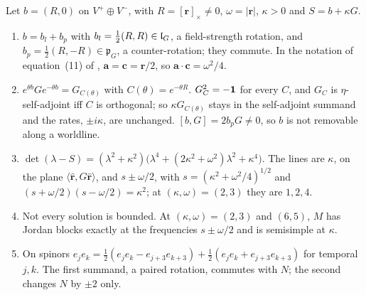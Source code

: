 \begin{proposition}
\label{e6:prop:binding}
Let $b=(R,0)$ on $V^+\oplus V^-$, with $R=[\mathbf r]_\times\neq0$, $\omega=|\mathbf r|$, $\kappa>0$ and $S=b+\kappa G$.
\begin{enumerate}[label=(\roman*),leftmargin=2.2em]
\item $b=b_l+b_p$ with $b_l=\tfrac12(R,R)\in\mathfrak l_G$, a field-strength rotation, and $b_p=\tfrac12(R,-R)\in\mathfrak p_G$, a counter-rotation; they commute. In
the notation of equation~(11) of \cite{RE}, $\mathbf a=\mathbf c=\mathbf r/2$, so $\mathbf a\cdot\mathbf c=\omega^2/4$.
\item $e^{\theta b}Ge^{-\theta b}=G_{C(\theta)}$ with $C(\theta)=e^{-\theta R}$. $G_C^2=-\mathbf 1$ for every $C$, and $G_C$ is $\eta$-self-adjoint iff $C$ is
orthogonal; so $\kappa G_{C(\theta)}$ stays in the self-adjoint summand and the rates, $\pm i\kappa$, are unchanged. $[b,G]=2b_pG\neq0$, so $b$ is not removable along a worldline.
\item $\det(\lambda-S)=(\lambda^2+\kappa^2)\bigl(\lambda^4+(2\kappa^2+\omega^2)\lambda^2+\kappa^4\bigr)$. The lines are $\kappa$, on the plane
$\langle\hat{\mathbf r},G\hat{\mathbf r}\rangle$, and $s\pm\omega/2$, with $s=(\kappa^2+\omega^2/4)^{1/2}$ and $(s+\omega/2)(s-\omega/2)=\kappa^2$; at $(\kappa,\omega)=(2,3)$
they are $1,2,4$.
\item Not every solution is bounded. At $(\kappa,\omega)=(2,3)$ and $(6,5)$, $M$ has Jordan blocks exactly at the frequencies $s\pm\omega/2$ and is
semisimple at $\kappa$.
\item On spinors $e_je_k=\tfrac12(e_je_k-e_{j+3}e_{k+3})+\tfrac12(e_je_k+e_{j+3}e_{k+3})$ for temporal $j,k$. The first summand, a paired rotation, commutes with
$N$; the second changes $N$ by $\pm2$ only.
\end{enumerate}
\end{proposition}

